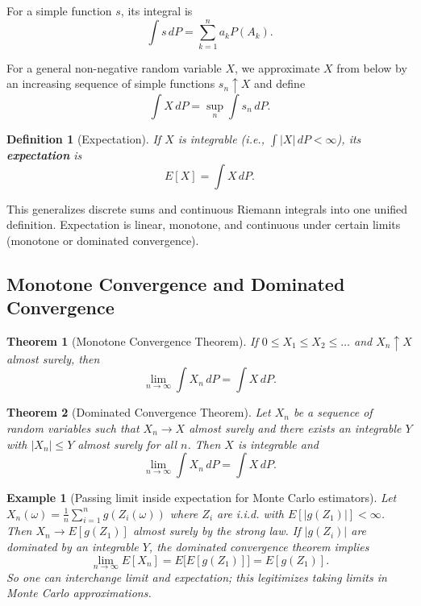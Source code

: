 \documentclass[11pt,a4paper]{article}
\newtheorem{definition}{Definition}[section]
\newtheorem{theorem}{Theorem}[section]
\newtheorem{example}{Example}[section]
\numberwithin{equation}{section}
\begin{document}
For a simple function $s$, its integral is
\[
\int s\,dP = \sum_{k=1}^n a_k P(A_k).
\]

For a general non-negative random variable $X$, we approximate $X$ from below by an increasing sequence of simple functions $s_n \uparrow X$ and define
\[
\int X\,dP = \sup_{n} \int s_n\,dP.
\]

\begin{definition}[Expectation]
If $X$ is integrable (i.e., $\int |X|\,dP < \infty$), its \textbf{expectation} is
\[
E[X] = \int X\,dP.
\]
\end{definition}

This generalizes discrete sums and continuous Riemann integrals into one unified definition. 
Expectation is linear, monotone, and continuous under certain limits (monotone or dominated convergence).

\subsection{Monotone Convergence and Dominated Convergence}

\begin{theorem}[Monotone Convergence Theorem]
If $0 \le X_1 \le X_2 \le \dots$ and $X_n \uparrow X$ almost surely, then
\[
\lim_{n\to\infty} \int X_n\,dP = \int X\,dP.
\]
\end{theorem}

\begin{theorem}[Dominated Convergence Theorem]
Let $X_n$ be a sequence of random variables such that $X_n \to X$ almost surely and there exists an integrable $Y$ with $|X_n| \le Y$ almost surely for all $n$. 
Then $X$ is integrable and
\[
\lim_{n\to\infty} \int X_n\,dP = \int X\,dP.
\]
\end{theorem}

\begin{example}[Passing limit inside expectation for Monte Carlo estimators]
Let $X_n(\omega) = \tfrac{1}{n}\sum_{i=1}^n g(Z_i(\omega))$ where $Z_i$ are i.i.d. with $E[|g(Z_1)|]<\infty$. 
Then $X_n \to E[g(Z_1)]$ almost surely by the strong law. 
If $|g(Z_i)|$ are dominated by an integrable $Y$, the dominated convergence theorem implies
\[
\lim_{n\to\infty} E[X_n] = E\big[ E[g(Z_1)] \big] = E[g(Z_1)].
\]
So one can interchange limit and expectation; this legitimizes taking limits in Monte Carlo approximations.

\end{example}

\newpage
\end{document}
